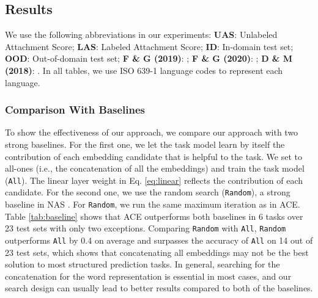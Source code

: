\documentclass{article} \usepackage{iclr2021_conference,times}
\begin{document}
\subsection{Results}
We use the following abbreviations in our experiments: \textbf{UAS}: Unlabeled Attachment Score; \textbf{LAS}: Labeled Attachment Score; \textbf{ID}: In-domain test set; \textbf{OOD}: Out-of-domain test set; \textbf{F \& G (2019)}: \citet{fernandez-gonzalez-gomez-rodriguez-2019-left}; \textbf{F \& G (2020)}: \citet{fernandez-gonzalez-gomez-rodriguez-2020-transition}; \textbf{D \& M (2018)}: \citet{dozat-manning-2018-simpler}. In all tables, we use ISO 639-1 language codes to represent each language.

\subsubsection{Comparison With Baselines} \label{sec:exp:base}
To show the effectiveness of our approach, we compare our approach with two strong baselines. For the first one, we let the task model learn by itself the contribution of each embedding candidate that is helpful to the task. We set  to all-ones (i.e., the concatenation of all the embeddings) and train the task model ({\tt All}). The linear layer weight  in Eq. \ref{eq:linear} reflects the contribution of each candidate. For the second one, we use the random search ({\tt Random}), a strong baseline in NAS \citep{li2020random}. For {\tt Random}, we run the same maximum iteration as in ACE.
Table \ref{tab:baseline} shows that ACE outperforms both baselines in 6 tasks over 23 test sets with only two exceptions. Comparing {\tt Random} with {\tt All}, {\tt Random} outperforms {\tt All} by 0.4 on average and surpasses the accuracy of {\tt All} on 14 out of 23 test sets, which shows that concatenating all embeddings may not be the best solution to most structured prediction tasks. 
In general, searching for the concatenation for the word representation is essential in most cases, and our search design can usually lead to better results compared to both of the baselines.
\end{document}

